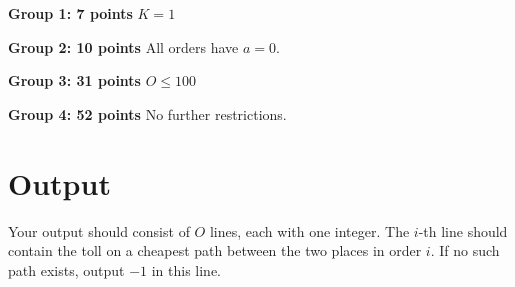 \begin{description}
    \item{\textbf{Group 1: 7 points}} $K = 1$                 %
    \item{\textbf{Group 2: 10 points}} All orders have $a=0$.  %
    \item{\textbf{Group 3: 31 points}} $O \leq 100$         %
    \item{\textbf{Group 4: 52 points}} No further restrictions. %
\end{description}


\section*{Output}
Your output should consist of $O$ lines, each with one integer. The $i$-th line should contain the toll on a cheapest path between the two places in order $i$. If no such path exists, output $-1$ in this line.
